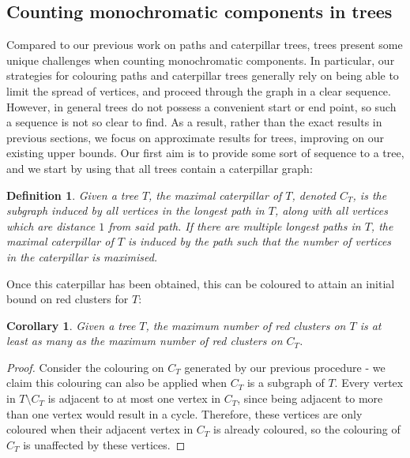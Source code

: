 \documentclass{mpaper}
\newtheorem{definition}{Definition}[section]
\newtheorem{corollary}{Corollary}[section]
\begin{document}
\subsection*{Counting monochromatic components in trees}

Compared to our previous work on paths and caterpillar trees, trees present some unique challenges when counting monochromatic components. In particular, our strategies for colouring paths and caterpillar trees generally rely on being able to limit the spread of vertices, and proceed through the graph in a clear sequence. However, in general trees do not possess a convenient start or end point, so such a sequence is not so clear to find. As a result, rather than the exact results in previous sections, we focus on approximate results for trees, improving on our existing upper bounds. Our first aim is to provide some sort of sequence to a tree, and we start by using that all trees contain a caterpillar graph:

\begin{definition}
  \label{def/maximal-caterpillar}
  Given a tree $T$, the \emph{maximal caterpillar of $T$}, denoted $C_T$, is the subgraph induced by all vertices in the longest path in $T$, along with all vertices which are distance $1$ from said path. If there are multiple longest paths in $T$, the maximal caterpillar of $T$ is induced by the path such that the number of vertices in the caterpillar is maximised.
\end{definition}

Once this caterpillar has been obtained, this can be coloured to attain an initial bound on red clusters for $T$:

\begin{corollary}
  \label{def/tree-caterpillar}
  Given a tree $T$, the maximum number of red clusters on $T$ is at least as many as the maximum number of red clusters on $C_T$.
\end{corollary}

\begin{proof}
  Consider the colouring on $C_T$ generated by our previous procedure - we claim this colouring can also be applied when $C_T$ is a subgraph of $T$. Every vertex in $T \setminus C_T$ is adjacent to at most one vertex in $C_T$, since being adjacent to more than one vertex would result in a cycle. Therefore, these vertices are only coloured when their adjacent vertex in $C_T$ is already coloured, so the colouring of $C_T$ is unaffected by these vertices.
\end{proof}
\end{document}
